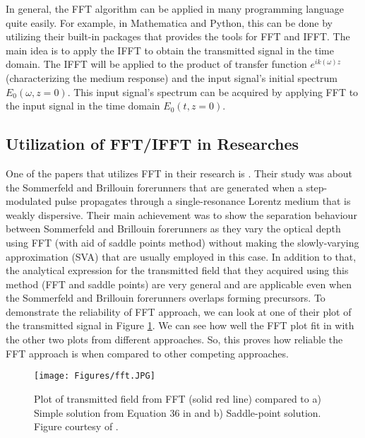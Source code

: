 In general, the FFT algorithm can be applied in many programming language quite easily. For example, in Mathematica and Python, this can be done by utilizing their built-in packages that provides the tools for FFT and IFFT. The main idea is to apply the IFFT to obtain the transmitted signal in the time domain. The IFFT will be applied to the product of transfer function $e^{i k(\omega)z}$ (characterizing the medium response) and the input signal's initial spectrum $E_{0}(\omega, z = 0)$. This input signal's spectrum can be acquired by applying FFT to the input signal in the time domain $E_{0}(t, z = 0)$.

\subsection{Utilization of FFT/IFFT in Researches}
One of the papers that utilizes FFT in their research is \cite{Macke2013}. Their study was about the Sommerfeld and Brillouin forerunners that are generated when a step-modulated pulse propagates through a single-resonance Lorentz medium that is weakly dispersive. Their main achievement was to show the separation behaviour between Sommerfeld and Brillouin forerunners as they vary the optical depth using FFT (with aid of saddle points method) without making the slowly-varying approximation (SVA) that are usually employed in this case. In addition to that, the analytical expression for the transmitted field that they acquired using this method (FFT and saddle points) are very general and are applicable even when the Sommerfeld and Brillouin forerunners overlaps forming precursors. To demonstrate the reliability of FFT approach, we can look at one of their plot of the transmitted signal in Figure \ref{fig: fft}. We can see how well the FFT plot fit in with the other two plots from different approaches. So, this proves how reliable the FFT approach is when compared to other competing approaches.

\begin{figure}
    \centering
    \texttt{[image: Figures/fft.JPG]}
    \caption[Plot of Transmitted Field Using FFT, Simple and Saddle-Point Solution]{Plot of transmitted field from FFT (solid red line) compared to a) Simple solution from Equation 36 in \protect\cite{Macke2013} and b) Saddle-point solution. Figure courtesy of \protect\cite{Macke2013}.}
    \label{fig: fft}
\end{figure}

